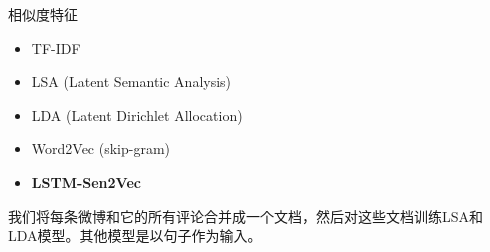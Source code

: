 \documentclass[aspectratio=169]{beamer}
\begin{document}
    {
    
    }

    \begin{frame}{相似度特征}
      \begin{itemize}
        \item TF-IDF
        \item LSA (Latent Semantic Analysis)
        \item LDA (Latent Dirichlet Allocation)
        \item Word2Vec (skip-gram)
        \item \textbf{LSTM-Sen2Vec }
      \end{itemize}

      我们将每条微博和它的所有评论合并成一个文档，然后对这些文档训练LSA和LDA模型。其他模型是以句子作为输入。
    \end{frame}
\end{document}
